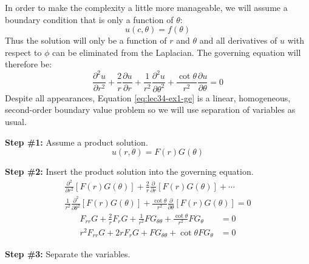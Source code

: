 \noindent In order to make the complexity a little more manageable, we will assume a boundary condition that is only a function of $\theta$:
\begin{equation*}
u(c,\theta) = f(\theta)
\end{equation*}
Thus the solution will only be a function of $r$ and $\theta$ and all derivatives of $u$ with respect to $\phi$ can be eliminated from the Laplacian.  The governing equation will therefore be:
\begin{equation}
\frac{\partial^2 u}{\partial r^2} + \frac{2}{r}\frac{\partial u}{\partial r} + \frac{1}{r^2}\frac{\partial^2 u}{\partial \theta^2} + \frac{\cot{\theta}}{r^2}\frac{\partial u}{\partial \theta} = 0
\label{eq:lec34-ex1-ge}
\end{equation}
Despite all appearances, Equation \ref{eq:lec34-ex1-ge} is a linear, homogeneous, second-order boundary value problem so we will use separation of variables as usual.

\vspace{0.25cm}

\noindent\textbf{Step \#1:} Assume a product solution.
\begin{equation*}
u(r,\theta) = F(r)G(\theta)
\end{equation*}

\vspace{0.25cm}

\noindent\textbf{Step \#2:} Insert the product solution into the governing equation.
\begin{multline*}
\frac{\partial^2}{\partial r^2}\left[F(r)G(\theta)\right] + \frac{2}{r}\frac{\partial}{\partial r}\left[ F(r)G(\theta)\right] + \cdots \\
\frac{1}{r^2}\frac{\partial^2}{\partial \theta^2}\left[F(r)G(\theta)\right] + \frac{\cot{\theta}}{r^2}\frac{\partial}{\partial \theta}\left[F(r)G(\theta)\right] = 0 
\end{multline*}
\begin{align*}
F_{rr}G + \frac{2}{r}F_rG + \frac{1}{r^2}FG_{\theta \theta} + \frac{\cot{\theta}}{r^2}FG_{\theta} &= 0 \\
r^2F_{rr}G + 2rF_rG + FG_{\theta \theta} + \cot{\theta}FG_{\theta}&= 0
\end{align*}

\vspace{0.25cm}

\noindent\textbf{Step \#3:} Separate the variables.

